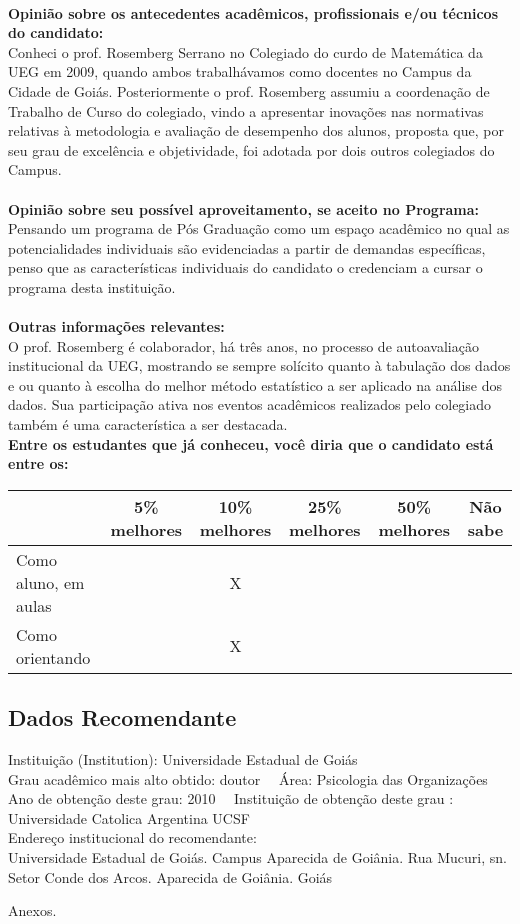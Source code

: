\documentclass[11pt]{article}
\begin{document}
\\
\textbf{Opinião sobre os antecedentes acadêmicos, profissionais e/ou técnicos do candidato:}
\\Conheci o prof. Rosemberg Serrano no Colegiado do curdo de Matemática da UEG em 2009, quando ambos trabalhávamos como docentes no Campus da Cidade de Goiás. Posteriormente o prof. Rosemberg assumiu a coordenação de Trabalho de Curso do colegiado, vindo a apresentar inovações nas normativas relativas à metodologia e avaliação de desempenho dos alunos, proposta que, por seu grau de excelência e objetividade, foi adotada por dois outros colegiados do Campus.\\
\\
\textbf{Opinião sobre seu possível aproveitamento, se aceito no Programa:}
\\Pensando um programa de Pós Graduação como um espaço acadêmico no qual as potencialidades individuais são evidenciadas a partir de demandas específicas, penso que as características individuais do candidato o credenciam a cursar o programa desta instituição.\\ 
\\
\textbf{Outras informações relevantes:} \\O prof. Rosemberg é colaborador, há três anos, no processo de autoavaliação institucional da UEG, mostrando se sempre solícito quanto à tabulação dos dados e ou quanto à escolha do melhor método estatístico a ser aplicado na análise dos dados. Sua participação ativa nos eventos acadêmicos realizados pelo colegiado também é uma característica a ser destacada.
\\[0.3cm]
\textbf{Entre os estudantes que já conheceu, você diria que o candidato está entre os:}
\\
\begin{tabular}{|l|c|c|c|c|c|}
\hline
 & 5\% melhores & 10\% melhores & 25\% melhores & 50\% melhores & Não sabe \\
\hline
Como aluno, em aulas &  & X &  &  & \\
\hline
Como orientando &  & X &  &  & \\
\hline
\end{tabular}
\subsection*{Dados Recomendante} 
	Instituição (Institution): Universidade Estadual de Goiás
\\ 
	Grau acadêmico mais alto obtido: doutor
	\ \ Área: Psicologia das Organizações
	\\
	Ano de obtenção deste grau: 2010
	\ \ 
	Instituição de obtenção deste grau : Universidade Catolica Argentina UCSF
	\\ 
	Endereço institucional do recomendante: \\ Universidade Estadual de Goiás. Campus Aparecida de Goiânia. Rua Mucuri, sn. Setor Conde dos Arcos. Aparecida de Goiânia. Goiás 
\begin{center}
Anexos.
\end{center}
\end{document}
